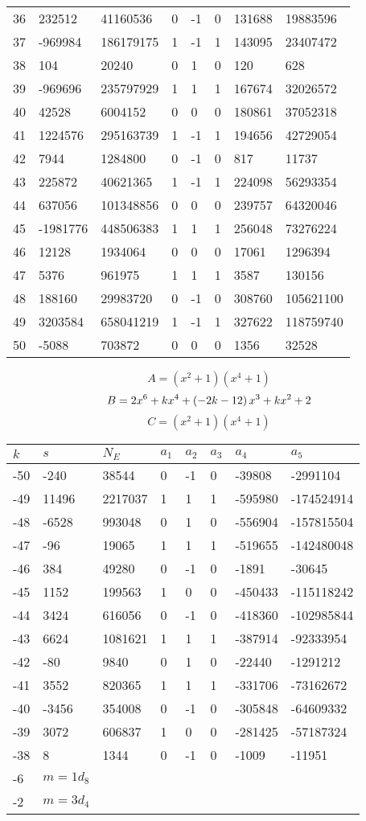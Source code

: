 \documentclass{amsart}
\begin{document}
\begin{longtable}{|l|l|l|lllll|}
36&232512&41160536&0&-1&0&131688&19883596\\
37&-969984&186179175&1&-1&1&143095&23407472\\
38&104&20240&0&1&0&120&628\\
39&-969696&235797929&1&1&1&167674&32026572\\
40&42528&6004152&0&0&0&180861&37052318\\
41&1224576&295163739&1&-1&1&194656&42729054\\
42&7944&1284800&0&-1&0&817&11737\\
43&225872&40621365&1&-1&1&224098&56293354\\
44&637056&101348856&0&0&0&239757&64320046\\
45&-1981776&448506383&1&1&1&256048&73276224\\
46&12128&1934064&0&0&0&17061&1296394\\
47&5376&961975&1&1&1&3587&130156\\
48&188160&29983720&0&-1&0&308760&105621100\\
49&3203584&658041219&1&-1&1&327622&118759740\\
50&-5088&703872&0&0&0&1356&32528\\
\hline
\end{longtable}
$$A=(x^2
 + 1)(x^4
 + 1)$$
$$B=2\*x^6
 + k\*x^4
 + \left(-2\*k
 - 12\right) \*x^3
 + k\*x^2
 + 2$$
$$C=(x^2
 + 1)(x^4
 + 1)$$
\begin{longtable}{|l|l|l|lllll|}
\hline
$k$ & $s$ & $N_E$ & $a_1$ & $a_2$ & $a_3$ & $a_4$ & $a_5$\\
\hline
-50&-240&38544&0&-1&0&-39808&-2991104\\
-49&11496&2217037&1&1&1&-595980&-174524914\\
-48&-6528&993048&0&1&0&-556904&-157815504\\
-47&-96&19065&1&1&1&-519655&-142480048\\
-46&384&49280&0&-1&0&-1891&-30645\\
-45&1152&199563&1&0&0&-450433&-115118242\\
-44&3424&616056&0&-1&0&-418360&-102985844\\
-43&6624&1081621&1&1&1&-387914&-92333954\\
-42&-80&9840&0&1&0&-22440&-1291212\\
-41&3552&820365&1&1&1&-331706&-73162672\\
-40&-3456&354008&0&-1&0&-305848&-64609332\\
-39&3072&606837&1&0&0&-281425&-57187324\\
-38&8&1344&0&-1&0&-1009&-11951\\
-6&$m=1d_{8}$&&\multicolumn{5}{c|}{}\\
-2&$m=3d_{4}$&&\multicolumn{5}{c|}{}\\
\hline
\end{longtable}
\end{document}
